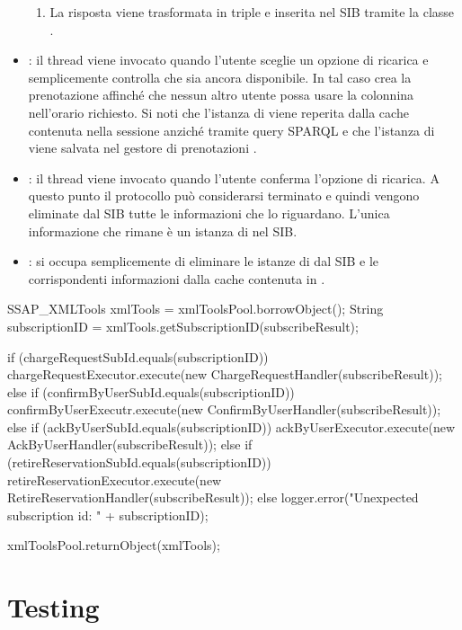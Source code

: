 \begin{itemize}
\begin{enumerate}
		\item La risposta viene trasformata in triple e inserita nel SIB tramite la classe .
	\end{enumerate}
	\item {}: il thread viene invocato quando l'utente sceglie un opzione di ricarica e semplicemente controlla che sia ancora disponibile. In tal caso crea la prenotazione affinché che nessun altro utente possa usare la colonnina nell'orario richiesto. Si noti che l'istanza di  viene reperita dalla cache contenuta nella sessione anziché tramite query SPARQL e che l'istanza di  viene salvata nel gestore di prenotazioni .
	\item {}: il thread viene invocato quando l'utente conferma l'opzione di ricarica. A questo punto il protocollo può considerarsi terminato e quindi vengono eliminate dal SIB tutte le informazioni che lo riguardano. L'unica informazione che rimane è un istanza di  nel SIB.
	\item {}: si occupa semplicemente di eliminare le istanze di  dal SIB e le corrispondenti informazioni dalla cache contenuta in .
\end{itemize}

\begin{java}[caption={Corpo di RequestDispatcher},label={lst:requestDispatcher}]
SSAP_XMLTools xmlTools = xmlToolsPool.borrowObject();
String subscriptionID = xmlTools.getSubscriptionID(subscribeResult);

if (chargeRequestSubId.equals(subscriptionID)) {
	chargeRequestExecutor.execute(new ChargeRequestHandler(subscribeResult));
} else if (confirmByUserSubId.equals(subscriptionID)) {
	confirmByUserExecutr.execute(new ConfirmByUserHandler(subscribeResult));
} else if (ackByUserSubId.equals(subscriptionID)) {
	ackByUserExecutor.execute(new AckByUserHandler(subscribeResult));
} else if (retireReservationSubId.equals(subscriptionID)) {
	retireReservationExecutor.execute(new RetireReservationHandler(subscribeResult));
} else {
	logger.error("Unexpected subscription id: " + subscriptionID);
}

xmlToolsPool.returnObject(xmlTools);
\end{java}	


\section{Testing}

